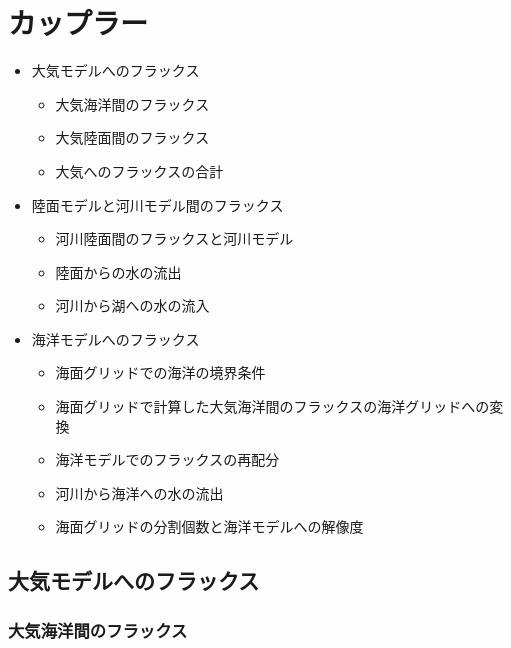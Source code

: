 \hypertarget{ux30abux30c3ux30d7ux30e9ux30fc}{%
\section{カップラー}\label{ux30abux30c3ux30d7ux30e9ux30fc}}

\begin{itemize}
\tightlist
\item
  大気モデルへのフラックス

  \begin{itemize}
  \tightlist
  \item
    大気海洋間のフラックス
  \item
    大気陸面間のフラックス
  \item
    大気へのフラックスの合計
  \end{itemize}
\item
  陸面モデルと河川モデル間のフラックス

  \begin{itemize}
  \tightlist
  \item
    河川陸面間のフラックスと河川モデル
  \item
    陸面からの水の流出
  \item
    河川から湖への水の流入
  \end{itemize}
\item
  海洋モデルへのフラックス

  \begin{itemize}
  \tightlist
  \item
    海面グリッドでの海洋の境界条件
  \item
    海面グリッドで計算した大気海洋間のフラックスの海洋グリッドへの変換
  \item
    海洋モデルでのフラックスの再配分
  \item
    河川から海洋への水の流出
  \item
    海面グリッドの分割個数と海洋モデルへの解像度
  \end{itemize}
\end{itemize}

\hypertarget{ux5927ux6c17ux30e2ux30c7ux30ebux3078ux306eux30d5ux30e9ux30c3ux30afux30b9}{%
\subsection{大気モデルへのフラックス}\label{ux5927ux6c17ux30e2ux30c7ux30ebux3078ux306eux30d5ux30e9ux30c3ux30afux30b9}}

\hypertarget{ux5927ux6c17ux6d77ux6d0bux9593ux306eux30d5ux30e9ux30c3ux30afux30b9}{%
\subsubsection{大気海洋間のフラックス}\label{ux5927ux6c17ux6d77ux6d0bux9593ux306eux30d5ux30e9ux30c3ux30afux30b9}}

